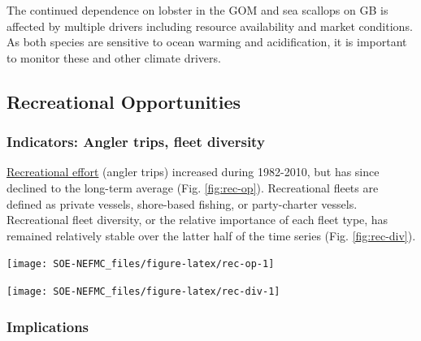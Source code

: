 \documentclass[
  10pt,
]{article}
\let\origfigure\figure
\let\endorigfigure\endfigure
\renewenvironment{figure}[1][2] {
    \expandafter\origfigure\expandafter[H]
} {
    \endorigfigure
}
\begin{document}
The continued dependence on lobster in the GOM and sea scallops on GB is affected by multiple drivers including resource availability and market conditions. As both species are sensitive to ocean warming and acidification, it is important to monitor these and other climate drivers.

\hypertarget{recreational-opportunities}{%
\subsection{Recreational Opportunities}\label{recreational-opportunities}}

\hypertarget{indicators-angler-trips-fleet-diversity}{%
\subsubsection{Indicators: Angler trips, fleet diversity}\label{indicators-angler-trips-fleet-diversity}}

\href{https://noaa-edab.github.io/catalog/recreational-fishing-indicators.html}{Recreational effort} (angler trips) increased during 1982-2010, but has since declined to the long-term average (Fig. \ref{fig:rec-op}). Recreational fleets are defined as private vessels, shore-based fishing, or party-charter vessels. Recreational fleet diversity, or the relative importance of each fleet type, has remained relatively stable over the latter half of the time series (Fig. \ref{fig:rec-div}).

\begin{figure}

{\centering \texttt{[image: SOE-NEFMC\_files/figure-latex/rec-op-1]} 

}

\caption{Recreational effort in New England.}\label{fig:rec-op}
\end{figure}
\begin{figure}

{\centering \texttt{[image: SOE-NEFMC\_files/figure-latex/rec-div-1]} 

}

\caption{Recreational fleet effort diversity in New England.}\label{fig:rec-div}
\end{figure}

\hypertarget{implications-2}{%
\subsubsection{Implications}\label{implications-2}}
\end{document}
